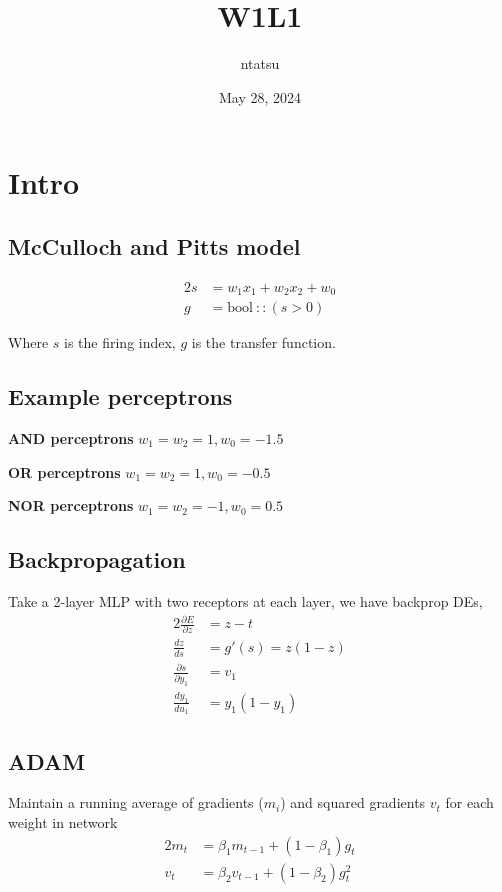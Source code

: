 \documentclass{article}
\title{W1L1}
\author{ntatsu}
\date{May 28, 2024}
\newcommand{\tb}[1]{\textbf{#1}}
\newcommand{\mr}[1]{\mathrm{#1}}
\theoremstyle{definition}
\theoremstyle{remark}
\begin{document}
\maketitle

\section{Intro}


\subsection*{McCulloch and Pitts model}
\begin{alignat*}{2}
    s &= w_1x_1 + w_2x_2 + w_0 \\
    g &= \mr{bool} \ :: (s > 0)
\end{alignat*}

Where $s$ is the firing index, $g$ is the transfer function.

\subsection*{Example perceptrons}
\tb{AND perceptrons}
$w_1 = w_2 = 1, w_0 = -1.5$

\tb{OR perceptrons}
$w_1 = w_2 = 1, w_0 = -0.5$

\tb{NOR perceptrons}
$w_1 = w_2 = -1, w_0 = 0.5$

\subsection*{Backpropagation}
Take a 2-layer MLP with two receptors at each layer, we have backprop DEs,
\begin{alignat*}{2}
    \frac{\partial E}{\partial z} &= z - t \\
    \frac{dz}{ds} &= g'(s) = z(1 - z) \\
    \frac{\partial s}{\partial y_1} &= v_1 \\
    \frac{dy_1}{du_1} &= y_1(1 - y_1)
\end{alignat*}

\subsection*{ADAM}
Maintain a running average of gradients ($m_i$) and squared gradients $v_t$ for each weight in network
\begin{alignat*}{2}
    m_t &= \beta_1m_{t-1} + (1-\beta_1)g_t \\
    v_t &= \beta_2v_{t-1} + (1-\beta_2)g_t^2 \\
\end{alignat*}
\end{document}
